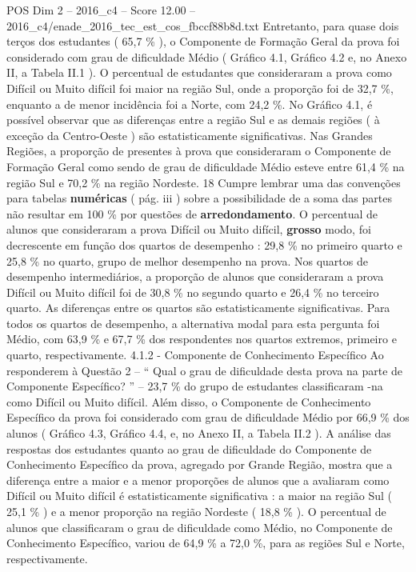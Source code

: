 \begin{textsample}{POS Dim 2 – 2016\_c4 – Score 12.00 – 2016\_c4/enade\_2016\_tec\_est\_cos\_fbccf88b8d.txt}
Entretanto, para quase dois terços dos estudantes ( 65,7 \% ), o Componente de Formação Geral da prova foi considerado com grau de dificuldade Médio ( Gráfico 4.1, Gráfico 4.2 e, no Anexo II, a Tabela II.1 ).
O percentual de estudantes que consideraram a prova como Difícil ou Muito difícil foi maior na região Sul, onde a proporção foi de 32,7 \%, enquanto a de menor incidência foi a Norte, com 24,2 \%.
No Gráfico 4.1, é possível observar que as diferenças entre a região Sul e as demais regiões ( à exceção da Centro-Oeste ) são estatisticamente significativas.
Nas Grandes Regiões, a proporção de presentes à prova que consideraram o Componente de Formação Geral como sendo de grau de dificuldade Médio esteve entre 61,4 \% na região Sul e 70,2 \% na região Nordeste. 18 Cumpre lembrar uma das convenções para tabelas \textbf{numéricas} ( pág. iii ) sobre a possibilidade de a soma das partes não resultar em 100 \% por questões de \textbf{arredondamento}.
O percentual de alunos que consideraram a prova Difícil ou Muito difícil, \textbf{grosso} modo, foi decrescente em função dos quartos de desempenho : 29,8 \% no primeiro quarto e 25,8 \% no quarto, grupo de melhor desempenho na prova.
Nos quartos de desempenho intermediários, a proporção de alunos que consideraram a prova Difícil ou Muito difícil foi de 30,8 \% no segundo quarto e 26,4 \% no terceiro quarto.
As diferenças entre os quartos são estatisticamente significativas.
Para todos os quartos de desempenho, a alternativa modal para esta pergunta foi Médio, com 63,9 \% e 67,7 \% dos respondentes nos quartos extremos, primeiro e quarto, respectivamente. 4.1.2 - Componente de Conhecimento Específico Ao responderem à Questão 2 – “ Qual o grau de dificuldade desta prova na parte de Componente Específico? ” – 23,7 \% do grupo de estudantes classificaram -na como Difícil ou Muito difícil.
Além disso, o Componente de Conhecimento Específico da prova foi considerado com grau de dificuldade Médio por 66,9 \% dos alunos ( Gráfico 4.3, Gráfico 4.4, e, no Anexo II, a Tabela II.2 ).
A análise das respostas dos estudantes quanto ao grau de dificuldade do Componente de Conhecimento Específico da prova, agregado por Grande Região, mostra que a diferença entre a maior e a menor proporções de alunos que a avaliaram como Difícil ou Muito difícil é estatisticamente significativa : a maior na região Sul ( 25,1 \% ) e a menor proporção na região Nordeste ( 18,8 \% ).
O percentual de alunos que classificaram o grau de dificuldade como Médio, no Componente de Conhecimento Específico, variou de 64,9 \% a 72,0 \%, para as regiões Sul e Norte, respectivamente.

\end{textsample}
